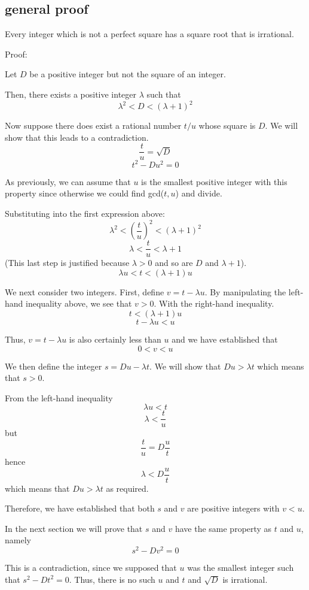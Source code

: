 \documentclass[11pt, oneside]{article}
\begin{document}
\subsection*{general proof}
Every integer which is not a perfect square has a square root that is irrational.

Proof:

Let $D$ be a positive integer but not the square of an integer.

Then, there exists a positive integer $\lambda$ such that
\[ \lambda^2 < D < (\lambda + 1)^2 \]

Now suppose there does exist a rational number $t/u$ whose square is $D$.  We will show that this leads to a contradiction.
\[ \frac{t}{u} = \sqrt{D} \]
\[ t^2 - Du^2 = 0 \]

As previously, we can assume that $u$ is the smallest positive integer with this property since otherwise we could find gcd($t,u$) and divide.

Substituting into the first expression above:
\[ \lambda^2 < (\frac{t}{u})^2 < (\lambda + 1)^2 \]
\[ \lambda < \frac{t}{u} < \lambda + 1 \]
(This last step is justified because $\lambda > 0$ and so are $D$ and $\lambda + 1$).
\[ \lambda u < t < (\lambda + 1)u \]

We next consider two integers.  First, define $v = t - \lambda u$.  By manipulating the left-hand inequality above, we see that $v > 0$.  With the right-hand inequality.
\[ t < (\lambda + 1)u \]
\[ t - \lambda u < u \]

Thus, $v = t - \lambda u$ is also certainly less than $u$ and we have established that
\[ 0 < v < u \]

We then define the integer $s = Du - \lambda t$.  We will show that $Du > \lambda t$ which means that $s > 0$.

From the left-hand inequality
\[ \lambda u < t \]
\[ \lambda < \frac{t}{u} \]
but 
\[ \frac{t}{u} = D \frac{u}{t}  \]
hence
\[ \lambda < D \frac{u}{t} \]
which means that $Du > \lambda t$ as required.

Therefore, we have established that both $s$ and $v$ are positive integers with $v < u$.  

In the next section we will prove that $s$ and $v$ have the same property as $t$ and $u$, namely
\[ s^2 - Dv^2 = 0 \]

This is a contradiction, since we supposed that $u$ was the smallest integer such that $s^2 - Dt^2 = 0$.  Thus, there is no such $u$ and $t$ and $\sqrt{D}$ is irrational.
\end{document}
